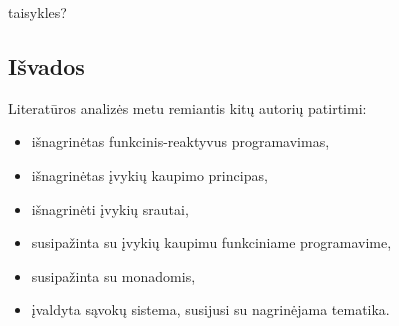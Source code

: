 taisykles?

\subsection{Išvados}

Literatūros analizės metu remiantis kitų autorių patirtimi:

\begin{itemize}

\item išnagrinėtas funkcinis-reaktyvus programavimas,

\item išnagrinėtas įvykių kaupimo principas,

\item išnagrinėti įvykių srautai,

\item susipažinta su įvykių kaupimu funkciniame programavime,

\item susipažinta su monadomis,

\item įvaldyta sąvokų sistema, susijusi su nagrinėjama tematika.

\end{itemize}
